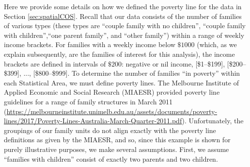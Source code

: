 \documentclass[12pt,a4paper]{article}
\begin{document}
\begin{appendices}
Here we provide some details on how we defined the poverty line for the data in Section \ref{sec:spatialCOS}. 
 Recall that our data consists of the number of families of various types (these types are ``couple family with no children'', ``couple family with children'',``one parent family'', and ``other family'') within a range of weekly income brackets. 
For families with a weekly income below $\$1000$ (which, as we explain subsequently, are the families of interest for this analysis), the income brackets are defined in intervals of $\$200$: negative or nil income, 
[\$1--\$199], [\$200--\$399], ..., [\$800--\$999]. 
To determine the number of families ``in poverty'' within each Statistical Area, we must define poverty lines. 
The Melbourne Institute of Applied Economic and Social Research (MIAESR) provided poverty line guidelines for a range of family structures in March 2011 (\url{https://melbourneinstitute.unimelb.edu.au/assets/documents/poverty-lines/2017/Poverty-Lines-Australia-March-Quarter-2011.pdf}).
Unfortunately, the groupings of our family units do not align exactly with the poverty line definitions as given by the MIAESR, and so, since this example is shown for purely illustrative purposes, we make several assumptions. 
First, we assume ``families with children'' consist of exactly two parents and two children.

\end{appendices}
\end{document}
